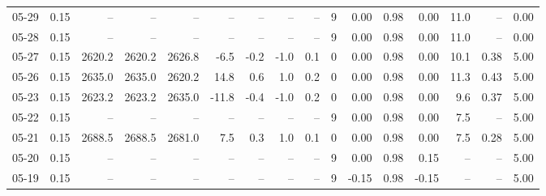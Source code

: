 \begin{threeparttable}
{\begin{tabular}{lrrrrrrrrrrrrrrr}
  05-29 &     0.15 &     -- &     -- &     -- &         -- &             -- &                       -- &                  -- &              9 &       0.00 &      0.98 &           0.00 &             11.0 &              -- &                   0.00 \\
  05-28 &     0.15 &     -- &     -- &     -- &         -- &             -- &                       -- &                  -- &              9 &       0.00 &      0.98 &           0.00 &             11.0 &              -- &                   0.00 \\
  05-27 &     0.15 & 2620.2 & 2620.2 & 2626.8 &       -6.5 &           -0.2 &                     -1.0 &                 0.1 &              0 &       0.00 &      0.98 &           0.00 &             10.1 &            0.38 &                   5.00 \\
  05-26 &     0.15 & 2635.0 & 2635.0 & 2620.2 &       14.8 &            0.6 &                      1.0 &                 0.2 &              0 &       0.00 &      0.98 &           0.00 &             11.3 &            0.43 &                   5.00 \\
  05-23 &     0.15 & 2623.2 & 2623.2 & 2635.0 &      -11.8 &           -0.4 &                     -1.0 &                 0.2 &              0 &       0.00 &      0.98 &           0.00 &              9.6 &            0.37 &                   5.00 \\
  05-22 &     0.15 &     -- &     -- &     -- &         -- &             -- &                       -- &                  -- &              9 &       0.00 &      0.98 &           0.00 &              7.5 &              -- &                   5.00 \\
  05-21 &     0.15 & 2688.5 & 2688.5 & 2681.0 &        7.5 &            0.3 &                      1.0 &                 0.1 &              0 &       0.00 &      0.98 &           0.00 &              7.5 &            0.28 &                   5.00 \\
  05-20 &     0.15 &     -- &     -- &     -- &         -- &             -- &                       -- &                  -- &              9 &       0.00 &      0.98 &           0.15 &               -- &              -- &                   5.00 \\
  05-19 &     0.15 &     -- &     -- &     -- &         -- &             -- &                       -- &                  -- &              9 &      -0.15 &      0.98 &          -0.15 &               -- &              -- &                   5.00 \\

\end{tabular}}
\end{threeparttable}

